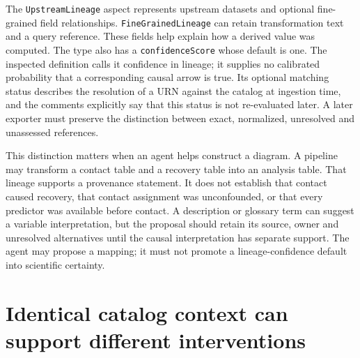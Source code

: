 The \texttt{UpstreamLineage} aspect represents upstream datasets and optional
fine-grained field relationships. \texttt{FineGrainedLineage} can retain
transformation text and a query reference. These fields help explain how a
derived value was computed. The type also has a \texttt{confidenceScore}
whose default is one. The inspected definition calls it confidence in lineage;
it supplies no calibrated probability that a corresponding causal arrow is
true. Its optional matching status describes the resolution of a URN against
the catalog at ingestion time, and the comments explicitly say that this
status is not re-evaluated later. A later exporter must preserve the distinction
between exact, normalized, unresolved and unassessed references.
\citep{exec16_dh_primary}

This distinction matters when an agent helps construct a diagram. A pipeline
may transform a contact table and a recovery table into an analysis table.
That lineage supports a provenance statement. It does not establish that
contact caused recovery, that contact assignment was unconfounded, or that
every predictor was available before contact. A description or glossary term
can suggest a variable interpretation, but the proposal should retain its
source, owner and unresolved alternatives until the causal interpretation has
separate support. The agent may propose a mapping; it must not promote a
lineage-confidence default into scientific certainty.
\citep{exec16_dh_primary,exec16_dh_contract}

\section{Identical catalog context can support different interventions}

